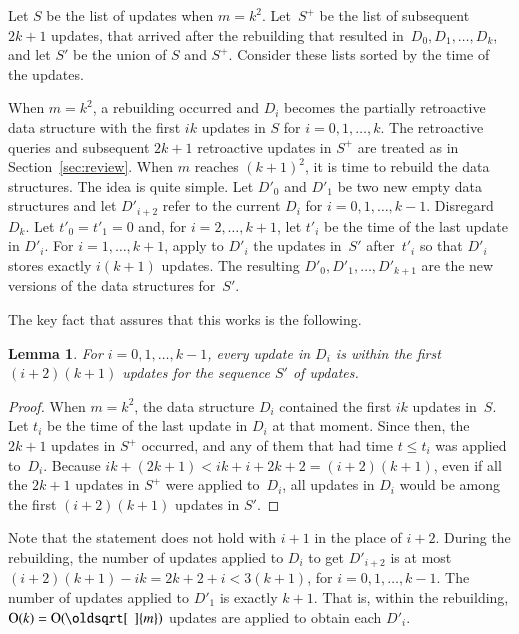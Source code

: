 \documentclass[3p,times,procedia]{elsarticle}
\renewcommand{\sqrt}[2][\mkern8mu]{\mkern-1mu\mathop{\oldsqrt[#1]{#2}}}
\newcommand{\Oh}{\mathrm{O}}
\newtheorem{lemma}     	[theorem] {Lemma}
\begin{document}
Let $S$ be the list of updates when $m=k^2$. 
Let~$S^+$ be the list of subsequent $2k+1$ updates, 
that arrived after the rebuilding that resulted in~$D_0,D_1,\ldots,D_k$,
and let $S'$ be the union of $S$ and $S^+$.  
Consider these lists sorted by the time of the updates. 

When $m=k^2$, a rebuilding occurred and $D_i$ becomes the partially retroactive 
data structure with the first $ik$ updates in $S$ for $i=0,1,\ldots,k$. 
The retroactive queries and subsequent $2k+1$ retroactive updates in $S^+$ 
are treated as in Section~\ref{sec:review}. 
When $m$ reaches $(k+1)^2$, it is time to rebuild the data structures.  
The idea is quite simple.  Let $D'_0$ and $D'_1$ be two new empty data structures 
and let $D'_{i+2}$ refer to the current $D_i$ for $i=0,1,\ldots,k-1$.  Disregard $D_k$.   
Let $t'_0 = t'_1 = 0$ and, for $i=2,\ldots,k+1$, 
let $t'_i$ be the time of the last update in $D'_i$.
For $i=1,\ldots,k+1$, apply to $D'_i$ the updates in~$S'$ 
after~$t'_i$ so that $D'_i$ stores exactly $i(k+1)$ updates.
The resulting $D'_0,D'_1,\ldots,D'_{k+1}$ are the new versions of the data structures for~$S'$. 

\medskip 

The key fact that assures that this works is the following. 

\begin{lemma}
  For $i=0,1,\ldots,k-1$, every update in $D_i$ is within 
  the first $(i+2)(k+1)$ updates for the sequence $S'$ of updates. 
\end{lemma}

\begin{proof}
  When $m=k^2$, the data structure $D_i$ contained the first $ik$ updates in~$S$. 
  Let $t_i$ be the time of the last update in $D_i$ at that moment.
  Since then, the $2k+1$ updates in $S^+$ occurred, 
  and any of them that had time $t \leq t_i$ was applied to~$D_i$. 
  Because $ik+(2k+1) < ik+i+2k+2 = (i+2)(k+1)$, 
  even if all the $2k+1$ updates in $S^+$ were applied to~$D_i$,
  all updates in $D_i$ would be among the first $(i+2)(k+1)$ updates in $S'$.
\end{proof}

Note that the statement does not hold with $i+1$ in the place of $i+2$. 
During the rebuilding, the number of updates applied to $D_i$ to get $D'_{i+2}$ 
is at most $(i+2)(k+1)-ik = 2k+2+i < 3(k+1)$, for $i=0,1,\ldots,k-1$.  
The number of updates applied to $D'_1$ is exactly $k+1$.  That is, within the 
rebuilding, $\Oh(k) = \Oh(\sqrt{m})$ updates are applied to obtain each $D'_i$.
\end{document}
